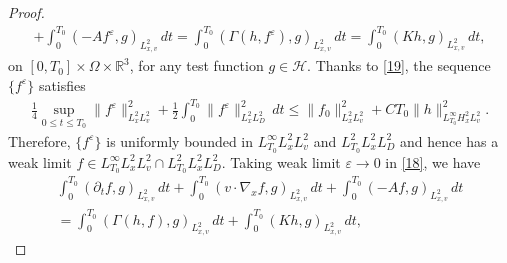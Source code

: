 \documentclass[reqno,a4paper]{amsart}
\numberwithin{equation}{section}
\newcommand{\1}{\mathbf{1}}
\newcommand{\R}{\mathbb{R}}
\newcommand{\ve}{\varepsilon}
\newcommand{\<}{\langle}
\renewcommand{\>}{\rangle}
\begin{document}
\begin{proof}
\begin{multline}
	+\int^{T_0}_0(- A f^\ve,g)_{L^2_{x,v}}\,dt = \int^{T_0}_0(\Gamma(h,f^\ve),g)_{L^2_{x,v}}\,dt=\int^{T_0}_0(Kh,g)_{L^2_{x,v}}\,dt,
\end{multline} on $[0,T_0]\times\Omega\times\R^3$, for any test function $g\in \mathcal{H}$.
 Thanks to \eqref{19}, the sequence $\{f^\ve\}$ satisfies 
 \begin{align}\label{19aa}
 	\frac{1}{4}\sup_{0\le t\le T_0}\|f^\ve\|^2_{L^2_xL^2_v} + \frac{1}{2}\int^{T_0}_0\|f^\ve\|_{L^2_xL^2_D}^2\,dt 
 	\le\|f_0\|^2_{L^2_xL^2_v}+ CT_0\|h\|^2_{L^\infty_{T_0}H^2_xL^2_v}. 
 \end{align}
 Therefore, $\{f^\ve\}$ is uniformly bounded in $L^\infty_{T_0}L^2_xL^2_v$ and $L^2_{T_0}L^2_xL^2_D$ and hence has a weak limit $f\in L^\infty_{T_0}L^2_xL^2_v\cap L^2_{T_0}L^2_xL^2_D$. Taking weak limit $\ve\to 0$ in \eqref{18}, we have 
\begin{multline}\label{18a}
	\int^{T_0}_0(\partial_tf,g)_{L^2_{x,v}}\,dt +\int^{T_0}_0(v\cdot \nabla_xf,g)_{L^2_{x,v}}\,dt
	+\int^{T_0}_0(- A f,g)_{L^2_{x,v}}\,dt \\= \int^{T_0}_0(\Gamma(h,f),g)_{L^2_{x,v}}\,dt+\int^{T_0}_0(Kh,g)_{L^2_{x,v}}\,dt,
\end{multline}
%	

\end{proof}
\end{document}
